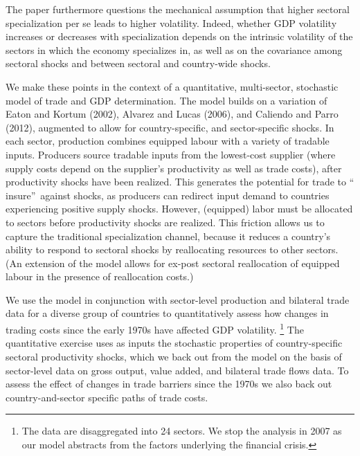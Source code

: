 \documentclass[12pt]{article}
\begin{document}
The paper furthermore questions the mechanical assumption that higher
sectoral specialization per se leads to higher volatility. Indeed, whether
GDP volatility increases or decreases with specialization depends on the
intrinsic volatility of the sectors in which the economy specializes in, as
well as on the covariance among sectoral shocks and between sectoral and
country-wide shocks.

We make these points in the context of a quantitative, multi-sector,
stochastic model of trade and GDP determination. The model builds on a
variation of Eaton and Kortum (2002), Alvarez and Lucas (2006), and Caliendo
and Parro (2012), augmented to allow for country-specific, and
sector-specific shocks. In each sector, production combines equipped labour
with a variety of tradable inputs. Producers source tradable inputs from the
lowest-cost supplier (where supply costs depend on the supplier's
productivity as well as trade costs), after productivity shocks have been
realized. This generates the potential for trade to \textquotedblleft
insure\textquotedblright\ against shocks, as producers can redirect input
demand to countries experiencing positive supply shocks. However, (equipped)
labor must be allocated to sectors before productivity shocks are realized.
This friction allows us to capture the traditional specialization channel,
because it reduces a country's ability to respond to sectoral shocks by
reallocating resources to other sectors. (An extension of the model allows
for ex-post sectoral reallocation of equipped labour in the presence of
reallocation costs.)

We use the model in conjunction with sector-level production and bilateral
trade data for a diverse group of countries to quantitatively assess how
changes in trading costs since the early 1970s have affected GDP volatility.%
\footnote{%
The data are disaggregated into 24 sectors. We stop the analysis in 2007 as
our model abstracts from the factors underlying the financial crisis.} The
quantitative exercise uses as inputs the stochastic properties of
country-specific sectoral productivity shocks, which we back out from the
model on the basis of sector-level data on gross output, value added, and
bilateral trade flows data. To assess the effect of changes in trade
barriers since the 1970s we also back out country-and-sector specific paths
of trade costs.
\end{document}
